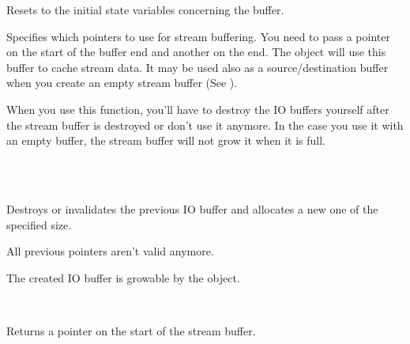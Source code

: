 
Resets to the initial state variables concerning the buffer.

\label{wxstreambufsetbufferio}


Specifies which pointers to use for stream buffering. You need to pass a pointer on the
start of the buffer end and another on the end. The object will use this buffer
to cache stream data. It may be used also as a source/destination buffer when
you create an empty stream buffer (See ).


When you use this function, you'll have to destroy the IO buffers yourself
after the stream buffer is destroyed or don't use it anymore.
In the case you use it with an empty buffer, the stream buffer will not grow
it when it is full.


\\
\\


Destroys or invalidates the previous IO buffer and allocates a new one of the
specified size.


All previous pointers aren't valid anymore.


The created IO buffer is growable by the object.


\\



Returns a pointer on the start of the stream buffer.


